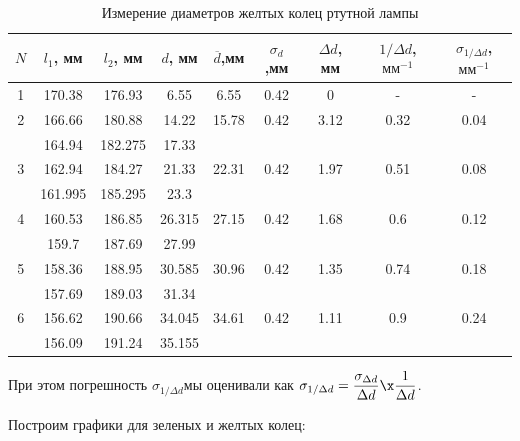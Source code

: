 \documentclass[12pt]{kiarticle}
\begin{document}
	\begin{table}[]
		\caption{Измерение диаметров желтых колец ртутной лампы}
		\begin{center}
			\begin{tabular}{|c|c|c|c|c|c|c|c|c|}
				\hline
					$ N $ & $ l_1 $, мм & $ l_2 $, мм & $ d $, мм & $ \overline{d} $,мм &  $ \sigma_d $,мм & $ \Delta d $, мм  &  $ 1/\Delta d $,$ мм^{-1} $ & $ \sigma_{1/\Delta d} $,$ мм^{-1} $\\
					\hline
			1 & 170.38 & 176.93 & 6.55 & 6.55 & 0.42 & 0 & - & - \\
			2 & 166.66 & 180.88 & 14.22 & 15.78 & 0.42 & 3.12 & 0.32 & 0.04 \\
			\text{} & 164.94 & 182.275 & 17.33 & \text{} & \text{} & \text{} & \text{} & \text{} \\
			
			3 & 162.94 & 184.27 & 21.33 & 22.31 & 0.42 & 1.97 & 0.51 & 0.08 \\
			\text{} & 161.995 & 185.295 & 23.3 & \text{} & \text{} & \text{} & \text{} & \text{} \\
			4 & 160.53 & 186.85 & 26.315 & 27.15 & 0.42 & 1.68 & 0.6 & 0.12 \\
			\text{} & 159.7 & 187.69 & 27.99 & \text{} & \text{} & \text{} & \text{} & \text{} \\
			5 & 158.36 & 188.95 & 30.585 & 30.96 & 0.42 & 1.35 & 0.74 & 0.18 \\
			\text{} & 157.69 & 189.03 & 31.34 & \text{} & \text{} & \text{} & \text{} & \text{} \\
			6 & 156.62 & 190.66 & 34.045 & 34.61 & 0.42 & 1.11 & 0.9 & 0.24 \\
			\text{} & 156.09 & 191.24 & 35.155 & \text{} & \text{} & \text{} & \text{} & \text{} \\
				\hline
			\end{tabular}
		\end{center}
		\label{Ye_table}
	\end{table}

	При этом погрешность $ \sigma_{1/\Delta d} $мы оценивали как $ \sigma_{1/\Delta d} = \dfrac{\sigma_{\Delta d}}{\Delta d} \x \dfrac{1}{\Delta d} $.
	
	Построим графики для зеленых и желтых колец:
	
\end{document}
